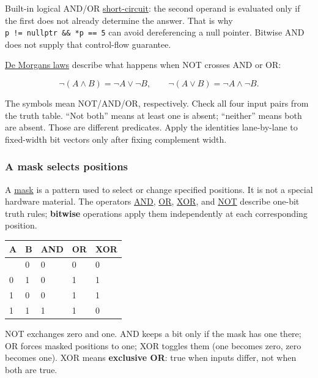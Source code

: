 Built-in logical AND/OR \hyperref[appendix-2e245a6fa8d3]{short-circuit}: the second operand is evaluated only if the first does not already determine the answer. That is why \texttt{p\ !=\ nullptr\ \&\&\ *p\ ==\ 5} can avoid dereferencing a null pointer. Bitwise AND does not supply that control-flow guarantee.

\hyperref[appendix-9079d3659da4]{De Morgan\textquotesingle s laws} describe what happens when NOT crosses AND or OR:

\[
\neg(A\land B)=\neg A\lor\neg B,\qquad
\neg(A\lor B)=\neg A\land\neg B.
\]

The symbols mean NOT/AND/OR, respectively. Check all four input pairs from the truth table. ``Not both'' means at least one is absent; ``neither'' means both are absent. Those are different predicates. Apply the identities lane-by-lane to fixed-width bit vectors only after fixing complement width.

\subsubsection{A mask selects positions}\label{05-engine-i-ch001-a-mask-selects-positions}

A \hyperref[appendix-dbe5905163c2]{mask} is a pattern used to select or change specified positions. It is not a special hardware material. The operators \hyperref[appendix-68b52453737c]{AND}, \hyperref[appendix-a427ce8ce8a6]{OR}, \hyperref[appendix-d49161831368]{XOR}, and \hyperref[appendix-8f38927cfc54]{NOT} describe one-bit truth rules; \textbf{bitwise} operations apply them independently at each corresponding position.

{\def\LTcaptype{none} %
\begin{longtable}[]{@{}lllll@{}}
\toprule\noalign{}
A & B & AND & OR & XOR \\
\midrule\noalign{}
\endhead
\bottomrule\noalign{}
\endlastfoot
0 & 0 & 0 & 0 & 0 \\
0 & 1 & 0 & 1 & 1 \\
1 & 0 & 0 & 1 & 1 \\
1 & 1 & 1 & 1 & 0 \\
\end{longtable}
}

NOT exchanges zero and one. AND keeps a bit only if the mask has one there; OR forces masked positions to one; XOR toggles them (one becomes zero, zero becomes one). XOR means \textbf{exclusive OR}: true when inputs differ, not when both are true.

